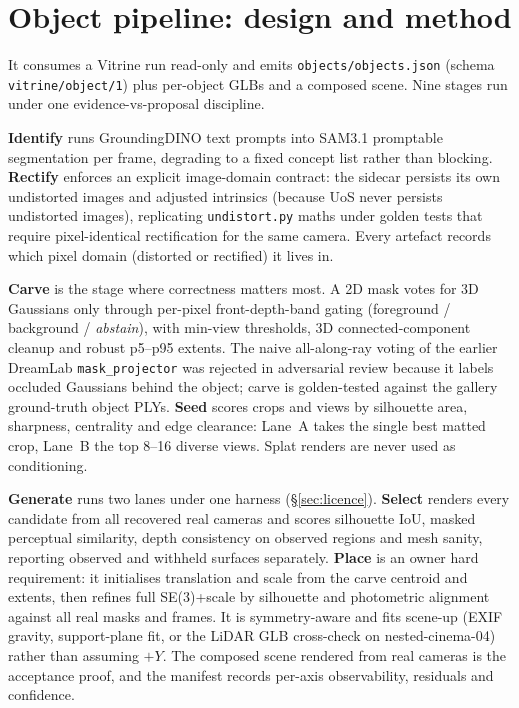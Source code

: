 \section{Object pipeline: design and method}

It consumes a Vitrine run read-only and emits \texttt{objects/objects.json}
(schema \texttt{vitrine/object/1}) plus per-object GLBs and a composed scene. Nine stages
run under one evidence-vs-proposal discipline.

\textbf{Identify} runs GroundingDINO text prompts into SAM3.1 promptable segmentation per
frame, degrading to a fixed concept list rather than blocking. \textbf{Rectify} enforces an
explicit image-domain contract: the sidecar persists its own undistorted images and adjusted
intrinsics (because UoS never persists undistorted images), replicating \texttt{undistort.py}
maths under golden tests that require pixel-identical rectification for the same camera. Every
artefact records which pixel domain (distorted or rectified) it lives in.

\textbf{Carve} is the stage where correctness matters most. A 2D mask votes for 3D Gaussians only
through per-pixel front-depth-band gating (foreground / background / \emph{abstain}), with
min-view thresholds, 3D connected-component cleanup and robust p5--p95 extents. The naive
all-along-ray voting of the earlier DreamLab \texttt{mask\_projector} was rejected in adversarial
review because it labels occluded Gaussians behind the object; carve is golden-tested against the
gallery ground-truth object PLYs. \textbf{Seed} scores crops and views by silhouette area,
sharpness, centrality and edge clearance: Lane~A takes the single best matted crop, Lane~B the
top 8--16 diverse views. Splat renders are never used as conditioning.

\textbf{Generate} runs two lanes under one harness (\S\ref{sec:licence}). \textbf{Select}
renders every candidate from all recovered real cameras and scores silhouette IoU, masked
perceptual similarity, depth consistency on observed regions and mesh sanity, reporting observed
and withheld surfaces separately. \textbf{Place} is an owner hard requirement: it initialises
translation and scale from the carve centroid and extents, then refines full SE(3)+scale by
silhouette and photometric alignment against all real masks and frames. It is symmetry-aware and
fits scene-up (EXIF gravity, support-plane fit, or the LiDAR GLB cross-check on
nested-cinema-04) rather than assuming $+Y$. The composed scene rendered from real cameras is the
acceptance proof, and the manifest records per-axis observability, residuals and confidence.

